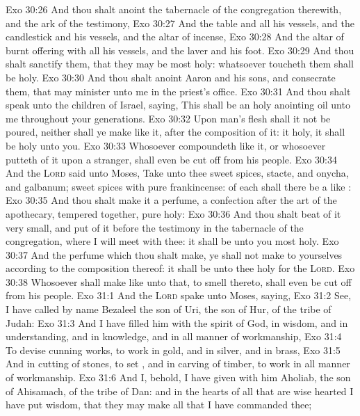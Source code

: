 \vs Exo 30:26 And thou shalt anoint the tabernacle of the congregation therewith, and the ark of the testimony,
\vs Exo 30:27 And the table and all his vessels, and the candlestick and his vessels, and the altar of incense,
\vs Exo 30:28 And the altar of burnt offering with all his vessels, and the laver and his foot.
\vs Exo 30:29 And thou shalt sanctify them, that they may be most holy: whatsoever toucheth them shall be holy.
\vs Exo 30:30 And thou shalt anoint Aaron and his sons, and consecrate them, that  may minister unto me in the priest's office.
\vs Exo 30:31 And thou shalt speak unto the children of Israel, saying, This shall be an holy anointing oil unto me throughout your generations.
\vs Exo 30:32 Upon man's flesh shall it not be poured, neither shall ye make  like it, after the composition of it: it  holy,  it shall be holy unto you.
\vs Exo 30:33 Whosoever compoundeth  like it, or whosoever putteth  of it upon a stranger, shall even be cut off from his people.
\vs Exo 30:34 And the \textsc{Lord} said unto Moses, Take unto thee sweet spices, stacte, and onycha, and galbanum;  sweet spices with pure frankincense: of each shall there be a like :
\vs Exo 30:35 And thou shalt make it a perfume, a confection after the art of the apothecary, tempered together, pure  holy:
\vs Exo 30:36 And thou shalt beat  of it very small, and put of it before the testimony in the tabernacle of the congregation, where I will meet with thee: it shall be unto you most holy.
\vs Exo 30:37 And  the perfume which thou shalt make, ye shall not make to yourselves according to the composition thereof: it shall be unto thee holy for the \textsc{Lord}.
\vs Exo 30:38 Whosoever shall make like unto that, to smell thereto, shall even be cut off from his people.
\vs Exo 31:1 And the \textsc{Lord} spake unto Moses, saying,
\vs Exo 31:2 See, I have called by name Bezaleel the son of Uri, the son of Hur, of the tribe of Judah:
\vs Exo 31:3 And I have filled him with the spirit of God, in wisdom, and in understanding, and in knowledge, and in all manner of workmanship,
\vs Exo 31:4 To devise cunning works, to work in gold, and in silver, and in brass,
\vs Exo 31:5 And in cutting of stones, to set , and in carving of timber, to work in all manner of workmanship.
\vs Exo 31:6 And I, behold, I have given with him Aholiab, the son of Ahisamach, of the tribe of Dan: and in the hearts of all that are wise hearted I have put wisdom, that they may make all that I have commanded thee;
